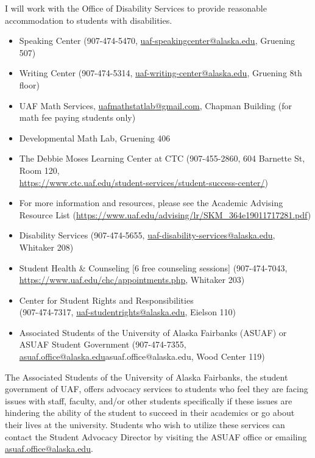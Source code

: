 \documentclass[12pt]{article}
\def\mailto#1{\href{mailto:#1}{#1}}
\begin{document}
 I will work with the Office of Disability Services to provide reasonable accommodation to students with disabilities.

\begin{itemize}
\setlength\itemsep{0em}
        \item Speaking Center (907-474-5470,
        \mailto{uaf-speakingcenter@alaska.edu}, Gruening 507)
\item Writing Center (907-474-5314, \mailto{uaf-writing-center@alaska.edu}, Gruening 8th floor)
\item UAF Math Services, \mailto{uafmathstatlab@gmail.com}, Chapman Building (for math fee paying students only)
\item Developmental Math Lab, Gruening 406
\item The Debbie Moses Learning Center at CTC (907-455-2860, 604 Barnette St, Room 120,\\ \mailto{https://www.ctc.uaf.edu/student-services/student-success-center/})
\item For more information and resources, please see the Academic Advising Resource List (\url{https://www.uaf.edu/advising/lr/SKM_364e19011717281.pdf})
\end{itemize}

\begin{itemize}
\setlength\itemsep{0em}
\item Disability Services (907-474-5655, \mailto{uaf-disability-services@alaska.edu}, Whitaker 208)
\item Student Health \& Counseling [6 free counseling sessions] (907-474-7043, \url{https://www.uaf.edu/chc/appointments.php}, Whitaker 203)
\item Center for Student Rights and Responsibilities \\(907-474-7317, \mailto{uaf-studentrights@alaska.edu}, Eielson 110)
\item Associated Students of the University of Alaska Fairbanks (ASUAF) or ASUAF Student Government (907-474-7355, \mailto{asuaf.office@alaska.edu}{asuaf.office@alaska.edu}, Wood Center 119)
\end{itemize}

The Associated Students of the University of Alaska Fairbanks, the student government of UAF, offers advocacy services to students who feel they are facing issues with staff, faculty, and/or other students specifically if these issues are hindering the ability of the student to succeed in their academics or go about their lives at the university. Students who wish to utilize these services can contact the Student Advocacy Director by visiting the ASUAF office or emailing \mailto{asuaf.office@alaska.edu}.
\end{document}

